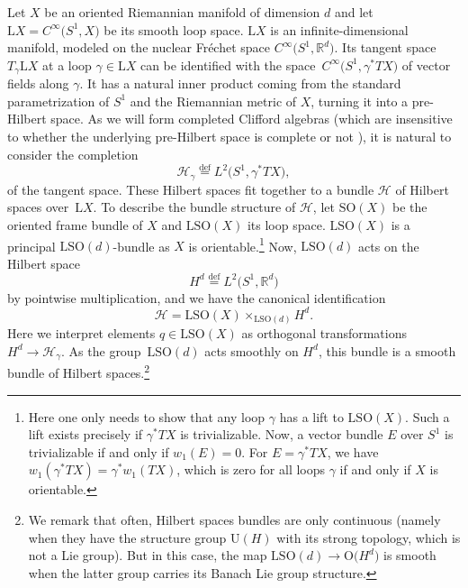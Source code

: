 \documentclass[11pt]{article}
\numberwithin{equation}{section}
\numberwithin{equation}{section}
\newcommand{\R}{\mathbb{R}}
\newcommand{\Cl}{\mathrm{Cl}}
\newcommand{\SO}{\mathrm{SO}}
\newcommand{\U}{\mathrm{U}}
\renewcommand{\O}{\mathrm{O}}
\renewcommand{\L}{\mathrm{L}}
\newcommand{\defeq}{\stackrel{\mathrm{def}}{=}}
\begin{document}
Let $X$ be an oriented Riemannian manifold of dimension $d$ and let $\L X = C^\infty\big(S^1, X\big)$ be its smooth loop space.
$\L X$ is an infinite-dimensional manifold, modeled on the nuclear Fr\'echet space $C^\infty\big(S^1, \R^d\big)$.
Its tangent space $T_\gamma \L X$ at a loop $\gamma \in \L X$ can be identified with the space~$C^\infty\big(S^1, \gamma^*TX\big)$ of vector fields along $\gamma$.
It has a natural inner product coming from the standard parametrization of $S^1$ and the Riemannian metric of $X$, turning it into a pre-Hilbert space.
As we will form completed Clifford algebras (which are insensitive to whether the underlying pre-Hilbert space is complete or not \cite{PlymenRobinson}), it is natural to consider the completion
\begin{equation*}%
 \mathcal{H}_\gamma \defeq L^2\big(S^1, \gamma^* TX\big),
\end{equation*}
of the tangent space.
These Hilbert spaces fit together to a bundle $\mathcal{H}$ of Hilbert spaces over~$\L X$.
To describe the bundle structure of $\mathcal{H}$, let $\SO(X)$ be the oriented frame bundle of $X$ and $\L \SO(X)$ its loop space.
$\L \SO(X)$ is a principal $\L \SO(d)$-bundle as $X$ is orientable.\footnote{Here one only needs to show that any loop $\gamma$ has a lift to $\L\SO(X)$. Such a lift exists precisely if $\gamma^*TX$ is trivializable.
Now, a vector bundle $E$ over $S^1$ is trivializable if and only if $w_1(E) = 0$. For $E = \gamma^*TX$, we have $w_1(\gamma^*TX) = \gamma^*w_1(TX)$, which is zero for all loops $\gamma$ if and only if $X$ is orientable.}
Now, $\L \SO(d)$ acts on the Hilbert space
\begin{equation}
\label{DefinitionHd}
 H^d \defeq L^2\big(S^1, \R^d\big)
\end{equation}
by pointwise multiplication, and we have the canonical identification
\begin{equation*}
 \mathcal{H} = \L\SO(X) \times_{\L\SO(d)} H^d.
\end{equation*}
Here we interpret elements $q \in \L \SO(X)$ as orthogonal transformations $H^d \to \mathcal{H}_\gamma$.
As the group~$\L\SO(d)$ acts smoothly on $H^d$, this bundle is a smooth bundle of Hilbert spaces.\footnote{We remark that often, Hilbert spaces bundles are only continuous (namely when they have the structure group $\U(H)$ with its strong topology, which is not a Lie group).
But in this case, the map $\L\SO(d) \to \O\big(H^d\big)$ is smooth when the latter group carries its Banach Lie group structure.}
\end{document}
